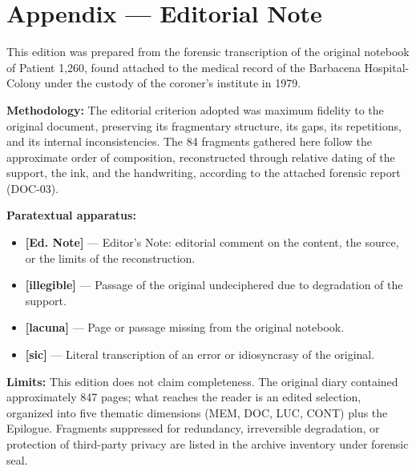 \cleardoublepage
\thispagestyle{empty}
\chapter*{Appendix --- Editorial Note}

\begingroup

This edition was prepared from the forensic transcription of the original notebook of Patient 1,260, found attached to the medical record of the Barbacena Hospital-Colony under the custody of the coroner's institute in 1979.

\vspace{0.6em}

\noindent\textbf{Methodology:}
The editorial criterion adopted was maximum fidelity to the original document, preserving its fragmentary structure, its gaps, its repetitions, and its internal inconsistencies. The 84 fragments gathered here follow the approximate order of composition, reconstructed through relative dating of the support, the ink, and the handwriting, according to the attached forensic report (DOC-03).

\vspace{0.6em}

\noindent\textbf{Paratextual apparatus:}
\begin{itemize}
  \item \textbf{[Ed. Note]} --- Editor's Note: editorial comment on the content, the source, or the limits of the reconstruction.
  \item \textbf{[illegible]} --- Passage of the original undeciphered due to degradation of the support.
  \item \textbf{[lacuna]} --- Page or passage missing from the original notebook.
  \item \textbf{[sic]} --- Literal transcription of an error or idiosyncrasy of the original.
\end{itemize}

\vspace{0.6em}

\noindent\textbf{Limits:}
This edition does not claim completeness. The original diary contained approximately 847 pages; what reaches the reader is an edited selection, organized into five thematic dimensions (MEM, DOC, LUC, CONT) plus the Epilogue. Fragments suppressed for redundancy, irreversible degradation, or protection of third-party privacy are listed in the archive inventory under forensic seal.

